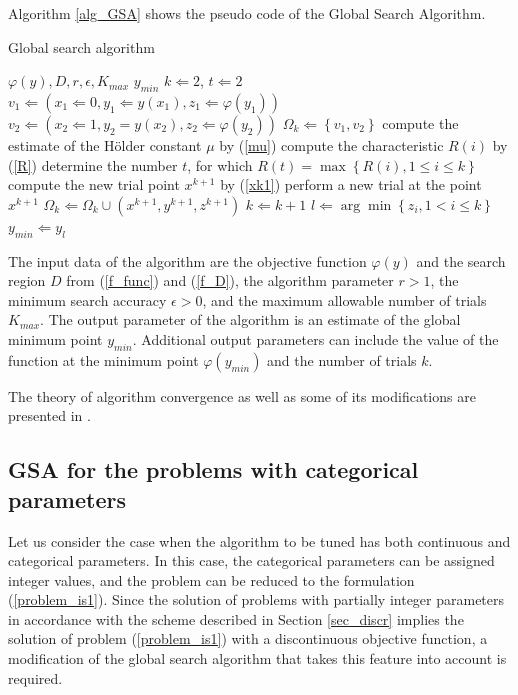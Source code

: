 \documentclass[iicol]{sn-jnl}
\theoremstyle{thmstyleone}%
\theoremstyle{thmstyletwo}%
\theoremstyle{thmstylethree}%
\begin{document}
Algorithm \ref{alg_GSA} shows the pseudo code of the Global Search Algorithm. 

\begin{algorithm}
\caption{Global search algorithm}\label{alg_GSA}
\begin{algorithmic}[1]
\Require $\varphi(y), D, r, \epsilon, K_{max}$
\Ensure $y_{min}$
\State $k \Leftarrow 2$, $t \Leftarrow 2$
\State $v_1 \Leftarrow (x_1 \Leftarrow 0, y_1 \Leftarrow y(x_1), z_1 \Leftarrow \varphi(y_1))$
\State $v_2 \Leftarrow (x_2 \Leftarrow 1, y_2=y(x_2), z_2 \Leftarrow \varphi(y_2))$
\State $\Omega_k \Leftarrow \left\{ v_1, v_2 \right\}$
    \State compute the estimate of the H\"older constant $\mu$ by (\ref{mu})
        \State compute the characteristic $R(i)$ by (\ref{R})
    \EndFor
    \State determine the number $t$, for which $R(t) = \max \left\{ R(i), 1 \leq i \leq k \right\}$
    \State compute the new trial point $x^{k+1}$ by (\ref{xk1})
    \State perform a new trial at the point $x^{k+1}$
    \State $\Omega_k \Leftarrow \Omega_k \cup (x^{k+1}, y^{k+1}, z^{k+1})$
    \State $k \Leftarrow k + 1$
\EndWhile
\State $l \Leftarrow \arg \min \left\{ z_i, 1 < i \leq k \right\}$
\State $y_{min} \Leftarrow y_l$
\State {}
\end{algorithmic}
\end{algorithm} 

The input data of the algorithm are the objective function $\varphi(y)$ and the search region $D$ from (\ref{f_func}) and (\ref{f_D}), the algorithm parameter $r>1$, the minimum search accuracy $\epsilon > 0$, and the maximum allowable number of trials $K_{max}$. The output parameter of the algorithm is an estimate of the global minimum point $y_{min}$. Additional output parameters can include the value of the function at the minimum point $\varphi(y_{min})$ and the number of trials $k$.

The theory of algorithm convergence as well as some of its modifications are presented in \citet{Strongin2000}.

\subsection{GSA for the problems with categorical parameters}\label{sec_mGSA}

Let us consider the case when the algorithm to be tuned has both continuous and categorical parameters.  In this case, the categorical parameters can be assigned integer values, and the problem can be reduced to the formulation (\ref{problem_is1}).
Since the solution of problems with partially integer parameters in accordance with the scheme described in Section \ref{sec_discr} implies the solution of problem (\ref{problem_is1}) with a discontinuous objective function, a modification of the global search algorithm that takes this feature into account is required.
\end{document}
